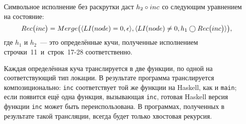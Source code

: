 Символьное исполнение без раскрутки даст $h_2\circ inc$ со следующим уравнением на состояние:
\[
Rec\big(inc\big) = Merge\big(\langle LI(node)=0, \epsilon\rangle, \langle LI(node)\neq0, h_1\bigcirc Rec\big(inc\big)\rangle\big),
\]
где $h_1$ и $h_2$~--- это определённые кучи, полученные исполнением строчки~11~и~строк~17-28 соответственно.

Каждая определённая куча транслируется в две функции, по одной на соответствующий тип локации.
В результате программа транслируется композиционально: \texttt{inc} соответствует той же функции на Haskell, как и \texttt{main}; если появится ещё одна функция, вызывающая \texttt{inc}, готовая Haskell версия функции \texttt{inc} может быть переиспользована. В программах, полученных в результате такой трансляции, всегда будет только хвостовая рекурсия.